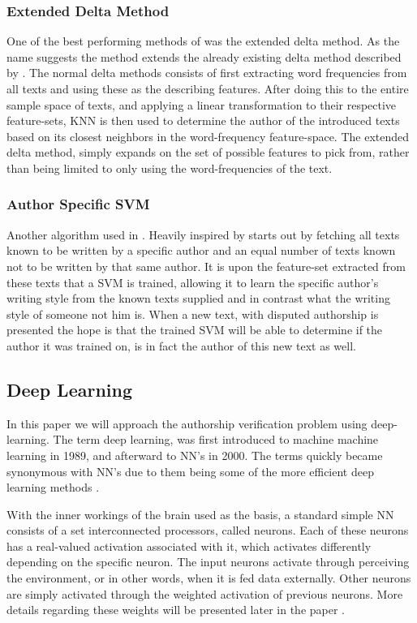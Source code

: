 \subsubsection{Extended Delta Method}

One of the best performing methods of \citet{US} was the extended delta method.
As the name suggests the method extends the already existing delta method
described by \citet{evert2015towards}. The normal delta methods consists of first
extracting word frequencies from all texts and using these as the describing
features. After doing this to the entire sample space of texts, and applying a
linear transformation to their respective feature-sets, \gls{KNN} is then used
to determine the author of the introduced texts based on its closest neighbors
in the word-frequency feature-space. The extended delta method, simply expands
on the set of possible features to pick from, rather than being limited to only
using the word-frequencies of the text.


\subsubsection{Author Specific SVM}

Another algorithm used in \citet{US}. Heavily inspired by \citet{hansen2014}
starts out by fetching all texts known to be written by a specific author and an
equal number of texts known not to be written by that same author. It is upon
the feature-set extracted from these texts that a \gls{SVM} is trained, allowing
it to learn the specific author's writing style from the known texts supplied
and in contrast what the writing style of someone not him is. When a new text,
with disputed authorship is presented the hope is that the trained \gls{SVM}
will be able to determine if the author it was trained on, is in fact the author
of this new text as well.


\subsection{Deep Learning}

In this paper we will approach the authorship verification problem using
deep-learning. The term deep learning, was first introduced to machine machine
learning in 1989, and afterward to \gls{NN}'s in 2000. The terms quickly became
synonymous with \gls{NN}'s due to them being some of the more efficient deep
learning methods \citep{Schmidhuber:2015}.

With the inner workings of the brain used as the basis, a standard simple
\gls{NN} consists of a set interconnected processors, called neurons. Each of
these neurons has a real-valued activation associated with it, which activates
differently depending on the specific neuron. The input neurons activate through
perceiving the environment, or in other words, when it is fed data externally.
Other neurons are simply activated through the weighted activation of previous
neurons. More details regarding these weights will be presented later in the
paper \citep{DBLP:journals/corr/Schmidhuber14}.

